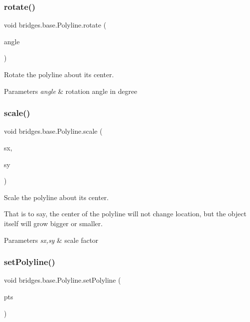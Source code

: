 \subsubsection{\texorpdfstring{rotate()}{rotate()}}
{\footnotesize\ttfamily void bridges.\+base.\+Polyline.\+rotate (\begin{DoxyParamCaption}\item[{float}]{angle }\end{DoxyParamCaption})}



Rotate the polyline about its center. 


\begin{DoxyParams}{Parameters}
{\em angle} & rotation angle in degree \\
\hline
\end{DoxyParams}
\mbox{\label{classbridges_1_1base_1_1_polyline_a5f07434dd7f07b68ac6a57ad267ad25c}} 
\subsubsection{\texorpdfstring{scale()}{scale()}}
{\footnotesize\ttfamily void bridges.\+base.\+Polyline.\+scale (\begin{DoxyParamCaption}\item[{float}]{sx,  }\item[{float}]{sy }\end{DoxyParamCaption})}



Scale the polyline about its center. 

That is to say, the center of the polyline will not change location, but the object itself will grow bigger or smaller.


\begin{DoxyParams}{Parameters}
{\em sx,sy} & scale factor \\
\hline
\end{DoxyParams}
\mbox{\label{classbridges_1_1base_1_1_polyline_a3fec0c95e9f26b173cba105bd39e9df1}} 
\subsubsection{\texorpdfstring{set\+Polyline()}{setPolyline()}}
{\footnotesize\ttfamily void bridges.\+base.\+Polyline.\+set\+Polyline (\begin{DoxyParamCaption}\item[{Array\+List$<$ Float $>$}]{pts }\end{DoxyParamCaption})}

